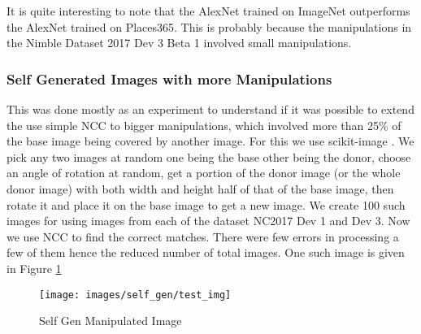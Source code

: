 \documentclass{article}
\begin{document}
It is quite interesting to note that the AlexNet trained on ImageNet outperforms the AlexNet trained on Places365. This is probably because the manipulations in the Nimble Dataset 2017 Dev 3 Beta 1 involved small manipulations.

\subsubsection{Self Generated Images with more Manipulations}
This was done mostly as an experiment to understand if it was possible to extend the use simple NCC to bigger manipulations, which involved more than 25\% of the base image being covered by another image. For this we use scikit-image \cite{scikit-image}. We pick any two images at random one being the base other being the donor, choose an angle of rotation at random, get a portion of the donor image (or the whole donor image) with both width and height half of that of the base image, then rotate it and place it on the base image to get a new image. We create 100 such images for using images from  each of the dataset NC2017 Dev 1 and Dev 3. Now we use NCC to find the correct matches. There were few errors in processing a few of them hence the reduced number of total images. One such image is given in Figure \ref{fig:sg_img}

\begin{figure}[H]
  \centering
  \texttt{[image: images/self\_gen/test\_img]}
  \caption{Self Gen Manipulated Image}
  \label{fig:sg_img}
\end{figure}
\end{document}
